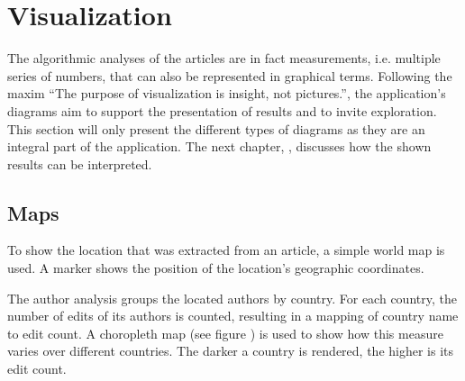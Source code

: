 \section{Visualization}\label{sec:visualization}

The algorithmic analyses of the articles are in fact measurements, i.e. multiple series of numbers, that can also be represented in graphical terms.
Following the maxim ``The purpose of visualization is insight, not pictures.''\cite[6]{card1999readings}, the application's diagrams aim to support the presentation of results and to invite exploration.
This section will only present the different types of diagrams as they are an integral part of the application. 
The next chapter, , discusses how the shown results can be interpreted.


\subsection{Maps}

To show the location that was extracted from an article, a simple world map is used.
A marker shows the position of the location's geographic coordinates.


The author analysis groups the located authors by country. 
For each country, the number of edits of its authors is counted, resulting in a mapping of country name to edit count.
A choropleth map (see figure ) is used to show how this measure varies over different countries.
The darker a country is rendered, the higher is its edit count.

